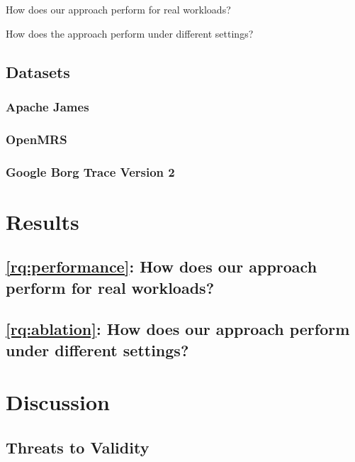 \begin{researchquestions}
    \item\label{rq:performance} How does our approach perform for real workloads?
    \item\label{rq:ablation} How does the approach perform under different settings?
\end{researchquestions}

\subsection{Datasets}\label{sec:dataset}

\subsubsection{Apache James}

\subsubsection{OpenMRS}

\subsubsection{Google Borg Trace Version 2}

\section{Results}

\subsection*{\cref{rq:performance}: How does our approach perform for real workloads?}

\subsection*{\cref{rq:ablation}: How does our approach perform under different settings?}

\section{Discussion}

\subsection{Threats to Validity}

